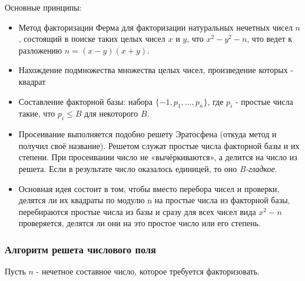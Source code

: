   Основные принципы:
    \begin{itemize}
     \item Метод факторизации Ферма для факторизации натуральных нечетных чисел {$n$}, состоящий в поиске таких целых чисел {$x$} и {$y$},
      что {$x^2-y^2-n$}, что ведет к разложению {$n=(x-y)(x+y)$}.
     \item Нахождение подмножества множества целых чисел, произведение которых - квадрат
     \item Составление факторной базы: набора {$\{-1, p_1, \dots, p_n \}$}, где {$p_i$} - простые числа такие, что {$p_i \le B$} 
      для некоторого {$B$}.
     \item Просеивание выполняется подобно решету Эратосфена (откуда метод и получил своё название). Решетом служат простые числа 
      факторной базы и их степени. При просеивании число не «вычёркиваются», а делится на число из решета. Если в результате число 
      оказалось единицей, то оно \textit{B-гладкое}.
     \item Основная идея состоит в том, чтобы вместо перебора чисел и проверки, делятся ли их квадраты по модулю n на простые числа из 
      факторной базы, перебираются простые числа из базы и сразу для всех чисел вида {$x^2-n$} проверяется, делятся ли они на это простое 
      число или его степень.
    \end{itemize}      
    
  \subsubsection{Алгоритм решета числового поля}
  Пусть {$n$} - нечетное составное число, которое требуется факторизовать.
  
